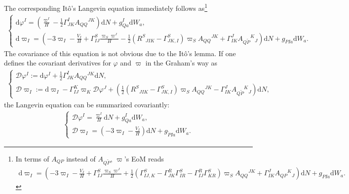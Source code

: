 \documentclass[aps, prd
, preprint
, nofootinbib 
, notitlepage
, longbibliography
]{revtex4-1}
\newcommand{\dd}{\mathrm{d}}
\newcommand{\dps}{\displaystyle}
\newcommand{\calD}{\mathcal{D}}
\newcommand{\bae}[1]{\begin{align} #1 \end{align}}
\newcommand{\bce}[1]{\begin{cases} #1 \end{cases}}
\begin{document}
The corresponding It\^o's Langevin equation immediately follows as\footnote{In terms of $A_{QP}$ instead of $A_{Q\tilde{P}}$, $\varpi$'s EoM reads
\bae{
    \dd\varpi_I=\left(-3\varpi_I-\frac{V_I}{H}+\Gamma^S_{IJ}\frac{\varpi_S\varpi^J}{H}+\frac{1}{2}\left(\Gamma^S_{IJ,K}-\Gamma^R_{JK}\Gamma^S_{IR}-\Gamma^R_{IJ}\Gamma^S_{KR}\right)\varpi_SA_{QQ}{}^{JK}+\Gamma^J_{IK}A_{QP}{}^K{}_J\right)\dd N+g_{PIa}\dd W_a.
}}
\bae{
	\bce{
		\dps
		\dd\varphi^I=\left(\frac{\varpi^I}{H}-\frac{1}{2}\Gamma^I_{JK}A_{QQ}{}^{JK}\right)\dd N+g^I_{Qa}\dd W_a, \\[10pt]
		\dps
		\dd\varpi_I=\left(-3\varpi_I-\frac{V_I}{H}+\Gamma^S_{IJ}\frac{\varpi_S\varpi^J}{H}
		-\frac{1}{2}\left(R^S{}_{JIK}-\Gamma^S_{JK,I}\right)\varpi_SA_{QQ}{}^{JK}+\Gamma^J_{IK}A_{Q\tilde{P}}{}^K{}_J\right)\dd N+g_{PIa}\dd W_a.
	}
}
The covariance of this equation is not obvious due to the It\^o's lemma. If one defines the covariant derivatives for $\varphi$ and $\varpi$ in the Graham's way as
\bae{\label{eq: Ito cov derivative}
	\bce{
		\dps
		\calD\varphi^I:=\dd\varphi^I+\frac{1}{2}\Gamma^I_{JK}A_{QQ}{}^{JK}\dd N, \\[10pt]
		\dps
		\calD\varpi_I:=\dd\varpi_I-\Gamma^K_{IJ}\varpi_K\calD\varphi^J
		+\left(\frac{1}{2}\left(R^S{}_{JIK}-\Gamma^S_{JK,I}\right)\varpi_SA_{QQ}{}^{JK}-\Gamma^J_{IK}A_{Q\tilde{P}}{}^K{}_J\right)\dd N,
	}
}
the Langevin equation can be summarized covariantly:
\bae{\label{eq: cov Langevin}
	\bce{
		\dps
		\calD\varphi^I=\frac{\varpi^I}{H}\dd N+g^I_{Qa}\dd W_a, \\[10pt]
		\dps
		\calD\varpi_I=\left(-3\varpi_I-\frac{V_I}{H}\right)\dd N+g_{\tilde{P}Ia}\dd W_a.
	}
}
\end{document}
